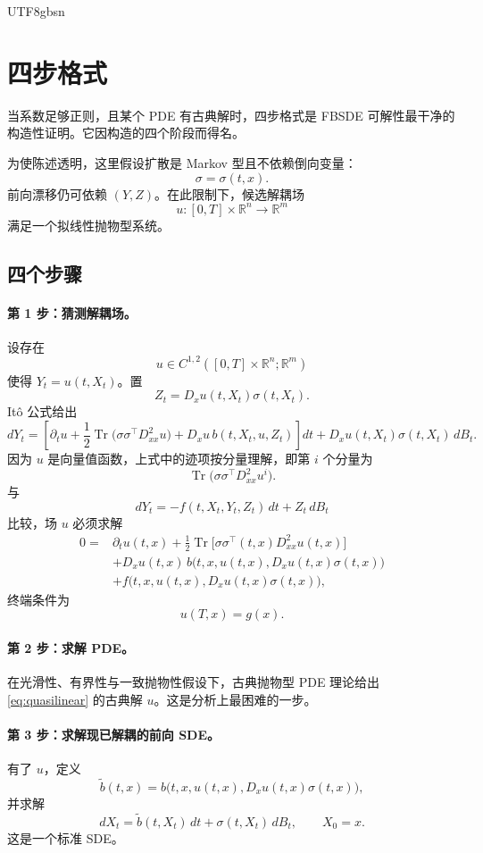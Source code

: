 \documentclass{article}
\theoremstyle{plain}
\theoremstyle{definition}
\theoremstyle{remark}
\numberwithin{equation}{section}
\newcommand{\R}{\mathbb{R}}
\begin{document}
\begin{CJK*}{UTF8}{gbsn}
\section{四步格式}

当系数足够正则，且某个 PDE 有古典解时，四步格式是 FBSDE 可解性最干净的构造性证明。它因构造的四个阶段而得名。

为使陈述透明，这里假设扩散是 Markov 型且不依赖倒向变量：
\[
  \sigma=\sigma(t,x).
\]
前向漂移仍可依赖 $(Y,Z)$。在此限制下，候选解耦场
\[
  u:[0,T]\times\R^n\to\R^m
\]
满足一个拟线性抛物型系统。

\subsection{四个步骤}

\paragraph{第 1 步：猜测解耦场。}
设存在
\[
  u\in C^{1,2}([0,T]\times\R^n;\R^m)
\]
使得 $Y_t=u(t,X_t)$。置
\[
  Z_t=D_xu(t,X_t)\sigma(t,X_t).
\]
It\^o 公式给出
\[
  dY_t=\left[\partial_tu+\frac12\operatorname{Tr}\bigl(\sigma\sigma^\top D^2_{xx}u\bigr)+D_xu\,b(t,X_t,u,Z_t)\right]dt+D_xu(t,X_t)\sigma(t,X_t)\,dB_t.
\]
因为 $u$ 是向量值函数，上式中的迹项按分量理解，即第 $i$ 个分量为
\[
  \operatorname{Tr}\bigl(\sigma\sigma^\top D^2_{xx}u^i\bigr).
\]
与
\[
  dY_t=-f(t,X_t,Y_t,Z_t)\,dt+Z_t\,dB_t
\]
比较，场 $u$ 必须求解
\begin{equation}\label{eq:quasilinear}
\begin{aligned}
  0={}&\partial_tu(t,x)+\frac12\operatorname{Tr}\bigl[\sigma\sigma^\top(t,x)D^2_{xx}u(t,x)\bigr] \\
  &+D_xu(t,x)\,b\bigl(t,x,u(t,x),D_xu(t,x)\sigma(t,x)\bigr) \\
  &+f\bigl(t,x,u(t,x),D_xu(t,x)\sigma(t,x)\bigr),
\end{aligned}
\end{equation}
终端条件为
\[
  u(T,x)=g(x).
\]

\paragraph{第 2 步：求解 PDE。}
在光滑性、有界性与一致抛物性假设下，古典抛物型 PDE 理论给出 \eqref{eq:quasilinear} 的古典解 $u$。这是分析上最困难的一步。

\paragraph{第 3 步：求解现已解耦的前向 SDE。}
有了 $u$，定义
\[
  \tilde b(t,x)=b\bigl(t,x,u(t,x),D_xu(t,x)\sigma(t,x)\bigr),
\]
并求解
\[
  dX_t=\tilde b(t,X_t)\,dt+\sigma(t,X_t)\,dB_t,\qquad X_0=x.
\]
这是一个标准 SDE。


\end{CJK*}
\end{document}
